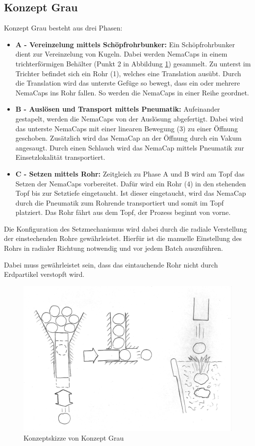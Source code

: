 \subsection{Konzept Grau}
Konzept Grau besteht aus drei Phasen:
\begin{itemize}
	\item \textbf{A - Vereinzelung mittels Schöpfrohrbunker:}
	Ein Schöpfrohrbunker dient zur Vereinzelung von Kugeln. Dabei werden NemaCaps in einem trichterförmigen Behälter (Punkt 2 in Abbildung \ref{fig:konzept_grau}) gesammelt. Zu unterst im Trichter befindet sich ein Rohr (1), welches eine Translation ausübt. Durch die Translation wird das unterste Gefüge so bewegt, dass ein oder mehrere NemaCaps ins Rohr fallen. So werden die NemaCaps in einer Reihe geordnet.
	
	\item \textbf{B - Auslösen und Transport mittels Pneumatik:}
	Aufeinander gestapelt, werden die NemaCaps von der Auslösung abgefertigt. Dabei wird das unterste NemaCaps mit einer linearen Bewegung (3) zu einer Öffnung geschoben. Zusätzlich wird das NemaCap an der Öffnung durch ein Vakum angesaugt. Durch einen Schlauch wird das NemaCap mittels Pneumatik zur Einsetzlokalität transportiert. 
	
	\item \textbf{C - Setzen mittels Rohr:}
	Zeitgleich zu Phase A und B wird am Topf das Setzen der NemaCaps vorbereitet. Dafür wird ein Rohr (4) in den stehenden Topf bis zur Setztiefe eingetaucht. Ist dieser eingetaucht, wird das NemaCap durch die Pneumatik zum Rohrende transportiert und somit im Topf platziert. Das Rohr fährt aus dem Topf, der Prozess beginnt von vorne.
\end{itemize}

Die Konfiguration des Setzmechanismus wird dabei durch die radiale Verstellung der einstechenden Rohre gewährleistet. Hierfür ist die manuelle Einstellung des Rohrs in radialer Richtung notwendig und vor jedem Batch auszuführen.

Dabei muss gewährleistet sein, dass das eintauchende Rohr nicht durch Erdpartikel verstopft wird.
\begin{figure}[H]
	\includegraphics[scale=0.6]{Illustrationen/5-Konzept/grau_Konzept.jpg}
	\caption{Konzeptskizze von Konzept Grau}
	\label{fig:konzept_grau}
\end{figure}
